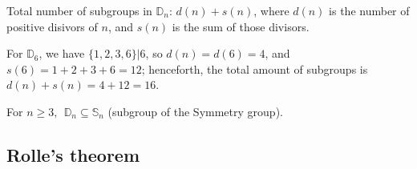 \documentclass{article}
\theoremstyle{definition}
\newenvironment{eg}[1]
{\renewcommand\theinnereg{#1}\innereg}
{\endinnereg}
\begin{document}
\vspace{0.3cm}
Total number of subgroups in $\mathbb{D}_n$: $d(n) + s(n)$, where $d(n)$ is the number of positive disivors of $n$, and $s(n)$ is the sum of those divisors.

\begin{eg}{}
For $\mathbb{D}_6$, we have $\{1,2,3,6\} | 6$, so $d(n) = d(6) = 4$, and
$s(6) = 1+2+3+6 = 12$; henceforth, the total amount of subgroups is $d(n)+s(n) = 4+12 = 16$.
\end{eg}

\vspace{0.3cm}
For $n \geq 3, ~~\mathbb{D}_n \subseteq \mathbb{S}_n$ (subgroup of the Symmetry group).

\subsection{Rolle's theorem} \label{rolle}
\end{document}
